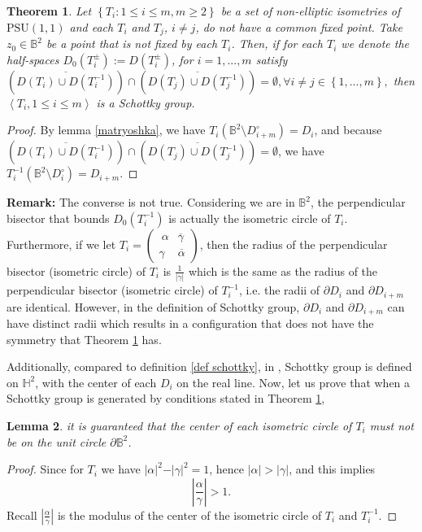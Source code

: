 \documentclass[12pt,oneside]{sfsuthesis}
\theoremstyle{plain} %
\newtheorem{theorem}{Theorem}[chapter]
\newtheorem{lemma}[theorem]{Lemma}
\theoremstyle{definition}  %
\theoremstyle{remark}  %
\theoremstyle{plain}
\begin{document}
{\begin{theorem}\label{thm schottky}
Let $\left\lbrace T_i: 1\leq i \leq m, m\geq 2\right\rbrace$ be a set of non-elliptic isometries of $\text{PSU}(1,1)$ and each $T_i$ and $T_j$, $i\neq j$, do not have a common fixed point. Take $z_0\in \mathbb{B}^2$ be a point that is not fixed by each $T_i$. Then, if for each $T_i$ we denote the half-spaces $D_0(T_i^{\pm}):=D(T_i^{\pm})$, for $i=1,...,m$ satisfy $
\left( \overline{D(T_i)\cup D(T_i^{-1}) }\right)\cap \left( \overline{D(T_j)\cup D(T_j^{-1})}\right)=\emptyset, 
\forall i\neq j\in\left\lbrace 1,...,m\right\rbrace,$ then $\left\langle T_i, 1\leq i \leq m\right\rangle$ is a Schottky group.
\end{theorem}
\begin{proof}
By lemma \ref{matryoshka}, we have $T_i ({\mathbb  B}^2\setminus D^{\circ}_{i+m}) = D_{i}$, and because $\left( \overline{D(T_i)\cup D(T_i^{-1}) }\right)\cap \left( \overline{D(T_j)\cup D(T_j^{-1})}\right)=\emptyset$, we have $T_i^{-1}\left( \mathbb{B}^2\setminus D^{\circ}_{i}\right)=D_{i+m}$.
\end{proof}
\textbf{Remark:} The converse is not true. Considering we are in $\mathbb{B}^2$, the perpendicular bisector that bounds $D_0(T_i^{-1})$ is actually the isometric circle of $T_i$\cite[section 7.22]{beardon2012geometry}. Furthermore, if we let $T_i=\begin{pmatrix}\
\alpha &  \overline{\gamma}\\
\gamma &  \overline{\alpha}
\end{pmatrix}$, then the radius of the perpendicular bisector (isometric circle) of $T_i$ is $\frac{1}{\vert \gamma \vert}$ which is the same as the radius of the perpendicular bisector (isometric circle) of $T_i^{-1}$, i.e. the radii of $\partial D_i$ and $\partial D_{i+m}$ are identical. However, in the definition of Schottky group, $\partial D_i$ and $\partial D_{i+m}$ can have distinct radii which results in a configuration that does not have the symmetry that Theorem \ref{thm schottky} has.

Additionally, compared to definition \ref{def schottky}, in \cite{borthwick2007spectral}, Schottky group is defined on $\mathbb{H}^2$, with the center of each $D_{i}$ on the real line. Now, let us prove that when a Schottky group is generated by conditions stated in Theorem \ref{thm schottky}, 
\begin{lemma}\label{the center of each isometric circle}
it is guaranteed that the center of each isometric circle of $T_i$ must not be on the unit circle $\partial \mathbb{B}^2$. 
\end{lemma}
\begin{proof}
Since for $T_i$ we have $\vert \alpha\vert^2-\vert \gamma\vert^2=1$, hence $\vert \alpha\vert>\vert \gamma \vert$, and this implies 
$$
\left \vert \frac{\alpha}{\gamma}\right\vert>1.
$$
Recall $\left \vert \frac{\alpha}{\gamma}\right\vert$ is the modulus of the center of the isometric circle of $T_i$ and $T_i^{-1}$.
\end{proof}

}
\end{document}
